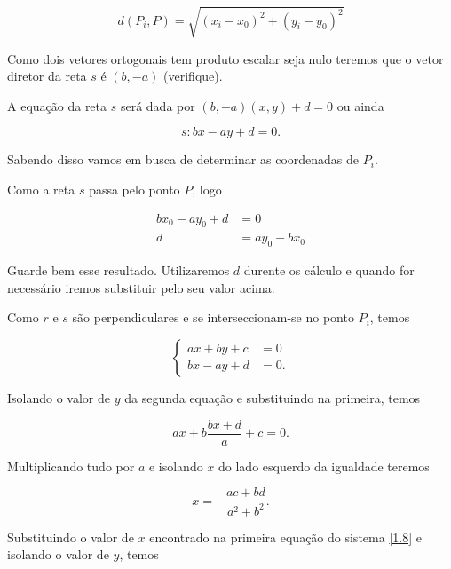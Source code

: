 \begin{equation}\label{1.5}
d(P_i,P)=\sqrt{(x_i-x_0)^2+(y_i-y_0)^2}
\end{equation}

Como dois vetores ortogonais tem produto escalar seja nulo teremos que o vetor diretor da reta $s$ é $(b,-a)$ (verifique).

A equação da reta $s$ será dada por $(b,-a)(x,y)+d=0$ ou ainda

\begin{equation}\label{1.6}
    s:bx-ay+d=0.
\end{equation}

Sabendo disso vamos em busca de determinar as coordenadas de $P_i$.

Como a reta $s$ passa pelo ponto $P$, logo 

\begin{equation}\label{1.7}
\begin{split}
bx_0-ay_0+d&=0\\
    d&=ay_0-bx_0
\end{split}
\end{equation}

Guarde bem esse resultado. Utilizaremos $d$ durente os cálculo e quando for necessário iremos substituir pelo seu valor acima.

Como $r$ e $s$ são perpendiculares e se interseccionam-se no ponto $P_i$, temos

\begin{equation}\label{1.8}
\begin{cases}
ax+by+c&=0\\
bx-ay+d&=0.
\end{cases}    
\end{equation}

Isolando o valor de $y$ da segunda equação e substituindo na primeira, temos

\begin{equation}\label{1.9}
    ax+b\dfrac{bx+d}{a}+c=0.
\end{equation}

Multiplicando tudo por $a$ e isolando $x$ do lado esquerdo da igualdade teremos

\begin{equation}\label{1.10}
    x=-\dfrac{ac+bd}{a^2+b^2}.
\end{equation}

Substituindo o valor de $x$ encontrado na primeira equação do sistema \eqref{1.8} e isolando o valor de $y$, temos

